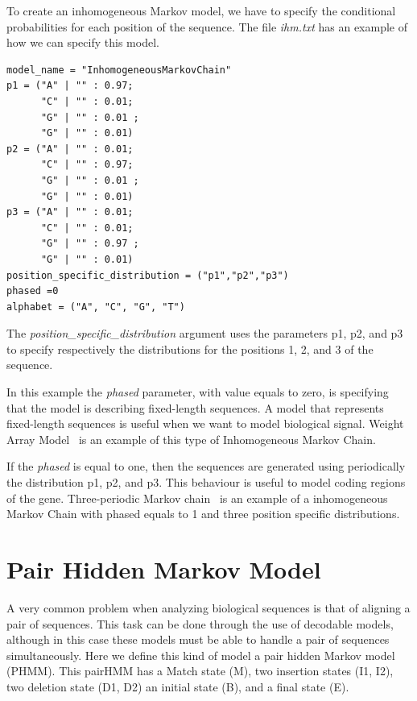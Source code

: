 To create an inhomogeneous Markov model, we have to specify the conditional probabilities for each position of the sequence. The file \textit{ihm.txt} has  an example of how we can specify this model.

\vspace{1em}
\begin{minipage}{\textwidth}
\begin{Verbatim}[frame=single,  label={ihm.txt}]
model_name = "InhomogeneousMarkovChain"
p1 = ("A" | "" : 0.97;
      "C" | "" : 0.01;
      "G" | "" : 0.01 ;
      "G" | "" : 0.01)
p2 = ("A" | "" : 0.01;
      "C" | "" : 0.97;
      "G" | "" : 0.01 ;
      "G" | "" : 0.01)
p3 = ("A" | "" : 0.01;
      "C" | "" : 0.01;
      "G" | "" : 0.97 ;
      "G" | "" : 0.01)
position_specific_distribution = ("p1","p2","p3")
phased =0
alphabet = ("A", "C", "G", "T")
\end{Verbatim}
\end{minipage}
\vspace{1em}

The \textit{position\_specific\_distribution} argument  uses the parameters p1, p2, and p3 to specify respectively the distributions for the positions 1, 2, and 3 of the sequence. 

In this example the \textit{phased} parameter, with value equals to zero, is specifying that the model is describing fixed-length sequences.  A model that represents fixed-length sequences is useful when we want to model biological signal. Weight Array Model~\cite{Zhang1993} is an example of this type of Inhomogeneous Markov Chain.

If the \textit{phased} is equal to one, then the sequences are generated  using  periodically the distribution p1, p2, and p3. This behaviour is useful to model coding regions of the gene. Three-periodic Markov chain~\cite{Borodovsky1993} is an example of a inhomogeneous Markov Chain with phased  equals to 1 and three position specific distributions.


\section{Pair Hidden Markov Model}

A very common problem when analyzing biological sequences is that of aligning a pair of sequences. This task can be done through the use of decodable models, although in this case these models must be able to handle a pair of sequences simultaneously. Here we define this kind of model a pair hidden Markov model (PHMM). This pairHMM has a Match state (M),  two insertion states (I1, I2), two deletion state (D1, D2) an initial state (B), and a final state (E). 

